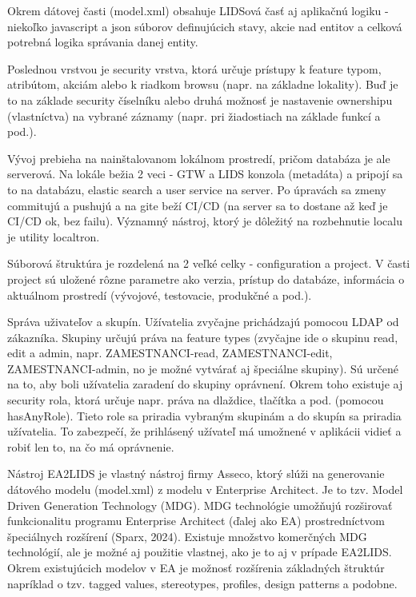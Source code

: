 Okrem dátovej časti (model.xml) obsahuje LIDSová časť aj aplikačnú logiku - niekoľko javascript a json súborov definujúcich stavy, akcie nad entitov a celková potrebná logika správania danej entity.

Poslednou vrstvou je security vrstva, ktorá určuje prístupy k feature typom, atribútom, akciám alebo k riadkom browsu (napr. na základne lokality). Buď je to na základe security číselníku alebo druhá možnosť je nastavenie ownershipu (vlastníctva) na vybrané záznamy (napr. pri žiadostiach na základe funkcí a pod.). 

Vývoj prebieha na nainštalovanom lokálnom prostredí, pričom databáza je ale serverová. Na lokále bežia 2 veci - GTW a LIDS konzola (metadáta) a pripojí sa to na databázu, elastic search a user service na server. Po úpravách sa zmeny commitujú a pushujú a na gite beží CI/CD (na server sa to dostane až keď je CI/CD ok, bez failu). Významný nástroj, ktorý je dôležitý na rozbehnutie localu je utility localtron. 

Súborová štruktúra je rozdelená na 2 veľké celky - configuration a project. V časti project sú uložené rôzne parametre ako verzia, prístup do databáze, informácia o aktuálnom prostredí (vývojové, testovacie, produkčné a pod.). 

Správa uživateľov a skupín. Užívatelia zvyčajne prichádzajú pomocou LDAP od zákazníka. Skupiny určujú práva na feature types (zvyčajne ide o skupinu read, edit a admin, napr. ZAMESTNANCI-read, ZAMESTNANCI-edit, ZAMESTNANCI-admin, no je možné vytvárať aj špeciálne skupiny). Sú určené na to, aby boli užívatelia zaradení do skupiny oprávnení. Okrem toho existuje aj security rola, ktorá určuje napr. práva na dlaždice, tlačítka a pod. (pomocou hasAnyRole). Tieto role sa priradia vybraným skupinám a do skupín sa priradia užívatelia. To zabezpečí, že prihlásený užívateľ má umožnené v aplikácii vidieť a robiť len to, na čo má oprávnenie.

Nástroj EA2LIDS je vlastný nástroj firmy Asseco, ktorý slúži na generovanie dátového modelu (model.xml) z modelu v Enterprise Architect. Je to tzv. Model Driven Generation Technology (MDG). MDG technológie umožňujú rozširovať funkcionalitu programu Enterprise Architect (ďalej ako EA) prostredníctvom špeciálnych rozšírení \scr(Sparx, 2024). Existuje množstvo komerčných MDG technológií, ale je možné aj použitie vlastnej, ako je to aj v prípade EA2LIDS. Okrem existujúcich modelov v EA je možnosť rozšírenia základných štruktúr napríklad o tzv. tagged values, stereotypes, profiles, design patterns a podobne. 

